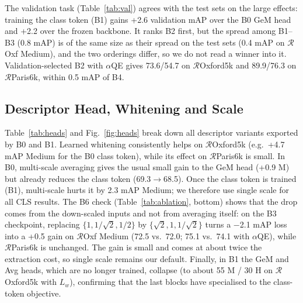 \documentclass[runningheads]{llncs}
\newcommand{\roxf}{$\mathcal{R}$Oxford5k}
\newcommand{\rpar}{$\mathcal{R}$Paris6k}
\newcommand{\roxs}{$\mathcal{R}$Oxf}
\newcommand{\aqe}{$\alpha$QE}
\begin{document}
The validation task (Table~\ref{tab:val}) agrees with the test sets on the
large effects: training the class token (B1) gains +2.6 validation mAP over
the B0 GeM head and +2.2 over the frozen backbone. It ranks B2 first, but the
spread among B1--B3 (0.8 mAP) is of the same size as their spread on the test
sets (0.4 mAP on \roxs{} Medium), and the two orderings differ, so we do not
read a winner into it. Validation-selected B2 with \aqe{} gives 73.6/54.7 on
\roxf{} and 89.9/76.3 on \rpar{}, within 0.5 mAP of B4.

\subsection{Descriptor Head, Whitening and Scale}
\label{sec:heads}

Table~\ref{tab:heads} and Fig.~\ref{fig:heads} break down all descriptor
variants exported by B0 and B1. Learned whitening consistently helps on
\roxf{} (e.g.\ +4.7 mAP Medium for the B0 class token), while its effect on
\rpar{} is small. In B0, multi-scale averaging gives the usual small gain to
the GeM head (+0.9 M) but already reduces the class token (69.3$\rightarrow$68.5).
Once the class token is trained (B1), multi-scale hurts it by 2.3 mAP Medium;
we therefore use single scale for all CLS results. The B6 check
(Table~\ref{tab:ablation}, bottom) shows that the drop comes from the
down-scaled inputs and not from averaging itself: on the B3 checkpoint,
replacing $\{1,1/\sqrt2,1/2\}$ by $\{\sqrt2,1,1/\sqrt2\}$ turns a $-$2.1 mAP loss
into a +0.5 gain on \roxs{} Medium (72.5 vs.\ 72.0; 75.1 vs.\ 74.1 with \aqe{}),
while \rpar{} is unchanged. The gain is small and comes at about twice the
extraction cost, so single scale remains our default. Finally, in B1 the GeM and
Avg heads, which are no longer trained, collapse (to about 55 M / 30 H on
\roxf{} with $L_w$), confirming that the last blocks have specialised to the
class-token objective.
\end{document}
